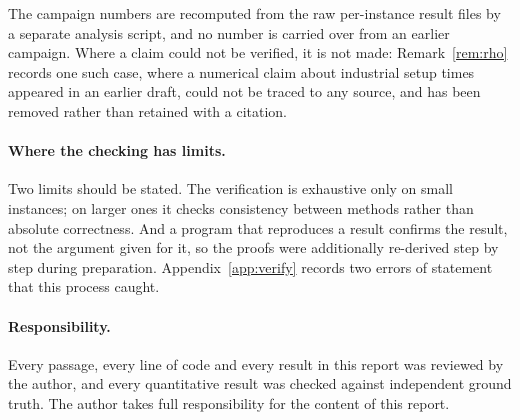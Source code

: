 The campaign numbers are recomputed from the raw per-instance result files by a
separate analysis script, and no number is carried over from an earlier campaign.
Where a claim could not be verified, it is not made: Remark~\ref{rem:rho} records one
such case, where a numerical claim about industrial setup times appeared in an earlier
draft, could not be traced to any source, and has been removed rather than retained
with a citation.

\paragraph{Where the checking has limits.}
Two limits should be stated. The verification is exhaustive only on small instances;
on larger ones it checks consistency between methods rather than absolute correctness.
And a program that reproduces a result confirms the result, not the argument given for
it, so the proofs were additionally re-derived step by step during preparation.
Appendix~\ref{app:verify} records two errors of statement that this process caught.

\paragraph{Responsibility.}
Every passage, every line of code and every result in this report was reviewed by the
author, and every quantitative result was checked against independent ground truth.
The author takes full responsibility for the content of this report.
